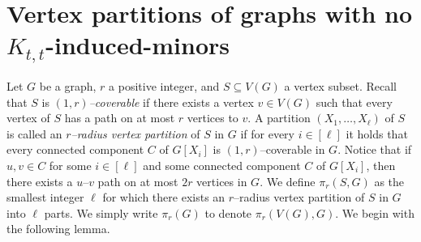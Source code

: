 
% 



\section{Vertex partitions of graphs with no $K_{t,t}$-induced-minors}


Let $G$ be a graph, $r$ a positive integer, and $S \subseteq V(G)$ a vertex subset. Recall that $S$ is \emph{$(1,r)$--coverable} if there exists a vertex $v\in V(G)$ such that every vertex of $S$ has a path on at most $r$ vertices to $v$. A partition $(X_1, \dots, X_\ell)$ of $S$ is called an \emph{$r$–radius vertex partition} of $S$ in $G$ if for every $i \in [\ell]$ it holds that every connected component $C$ of $G[X_i]$ is $(1,r)$--coverable in $G$. Notice that if $u,v\in C$ for some $i\in[\ell]$ and some connected component $C$ of $G[X_i]$, then there exists a $u$--$v$ path on at most $2r$ vertices in $G$. We define $\pi_r(S,G)$ as the smallest integer $\ell$ for which there exists an $r$–radius vertex partition of $S$ in $G$ into $\ell$ parts. We simply write $\pi_r(G)$ to denote $\pi_r(V(G),G)$.
% 
We begin with the following lemma.

